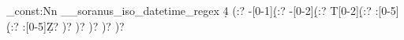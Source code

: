 %
%
%
% 
%

%

\regex_const:Nn \g__soranus_iso_datetime_regex
  {
    \A %
      \d{4} %
      (:?
        -[0-1]\d %
        (:?
          -[0-2]\d %
          (:?
            T[0-2]\d %
            (:?
              :[0-5]\d %
              (:?
                :[0-5]\d %
                Z? %
              )?
            )?
          )?
        )?
      )?
    \Z %
  }
